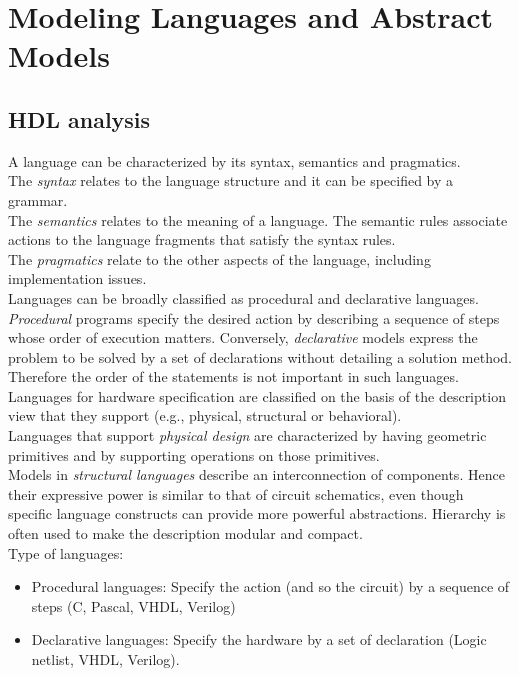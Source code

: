 \section{Modeling Languages and Abstract Models}

\subsection{HDL analysis}
A language can be characterized by its  syntax, semantics  and  pragmatics.\\
The \textit{syntax} relates to the language structure and it can be specified by a grammar.\\
The \textit{semantics} relates to the meaning of a language. The semantic rules associate actions to the language fragments that satisfy the syntax rules.\\
The \textit{pragmatics} relate to the other aspects of the language, including implementation issues. \\
Languages can be broadly classified as  procedural  and  declarative  languages. \textit{Procedural} programs specify the desired action by describing a sequence of steps whose order of execution matters. Conversely, \textit{declarative} models express the problem to be solved by a set of declarations without detailing a solution method. Therefore the order of the statements is not important in such languages.\\
Languages for hardware specification are classified on the basis of the description view that they support (e.g., physical, structural or behavioral).\\
Languages that support \textit{physical design} are characterized by having geometric primitives and by supporting operations on those primitives.\\
Models in \textit{structural languages} describe an interconnection of components. Hence their expressive power is similar to that of circuit schematics, even though specific language constructs can provide more powerful abstractions. Hierarchy is often used to make the description modular and compact.\\
Type of languages:
\begin{itemize}
\item Procedural languages: Specify the action (and so the circuit) by a sequence of steps (C, Pascal, VHDL, Verilog)
\item Declarative languages: Specify the hardware by a set of declaration (Logic netlist, VHDL, Verilog).
\end{itemize}
